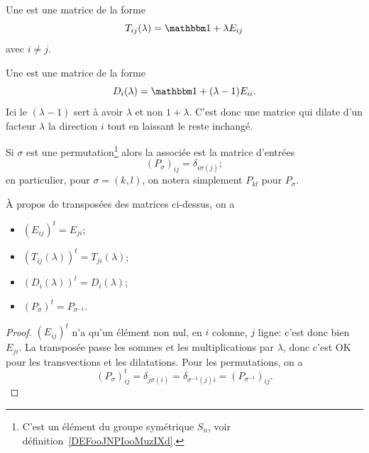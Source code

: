 \begin{definition}    \label{DEF_transvectionDilatationPermutation}
    Une  est une matrice de la forme
    \begin{equation}
        T_{ij}(\lambda)=\mtu+\lambda E_{ij}
    \end{equation}
    avec \( i\neq j\).

    Une  est une matrice de la forme
    \begin{equation}
        D_i(\lambda)=\mtu+(\lambda-1)E_{ii}.
    \end{equation}
    Ici le \( (\lambda-1)\) sert à avoir \( \lambda\) et non \( 1+\lambda\). C'est donc une matrice qui dilate d'un facteur \( \lambda\) la direction \( i\) tout en laissant le reste inchangé.

    Si \( \sigma\) est une permutation\footnote{C'est un élément du groupe symétrique \( S_n\), voir définition~\ref{DEFooJNPIooMuzIXd}.} alors la  associée est la matrice d'entrées
    \begin{equation}
        (P_{\sigma})_{ij}=\delta_{i\sigma(j)};
    \end{equation}
    en particulier, pour \( \sigma = (k,l) \), on notera simplement \( P_{kl} \) pour \( P_{\sigma} \).
\end{definition}

\begin{lemma}   \label{LEM_transpoMatricesTransfo}
À propos de transposées des matrices ci-dessus, on a
\begin{itemize}
  \item
    \( (E_{ij})^t = E_{ji} \);
  \item
    \( (T_{ij}(\lambda))^t = T_{ji}(\lambda) \);
  \item
    \( (D_{i}(\lambda))^t = D_{i}(\lambda) \);
  \item
    \( (P_{\sigma})^t = P_{\sigma^{-1}} \).
\end{itemize}
\end{lemma}

\begin{proof}
  \( (E_{ij})^t \) n'a qu'un élément non nul, en \( i \)\ieme{} colonne, \( j \)\ieme{} ligne: c'est donc bien \( E_{ji} \). La transposée passe les sommes et les multiplications par \( \lambda \), donc c'est OK pour les transvections et les dilatations. Pour les permutations, on a
    \begin{equation}
        (P_{\sigma})^t_{ij}=\delta_{j\sigma(i)} = \delta_{\sigma^{-1}(j)i} = (P_{\sigma^{-1}})_{ij}.
    \end{equation}
\end{proof}


